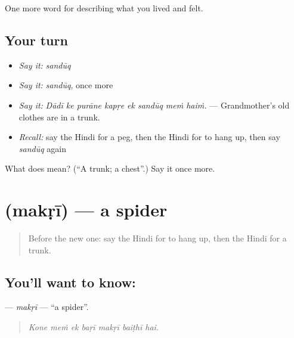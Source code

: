\begin{grammarlens}[title={What you've built}]
One more word for describing what you lived and felt.
\end{grammarlens}

\subsection*{Your turn}
\begin{itemize}
\raggedright
  \item \emph{Say it:} \emph{sandūq}
  \item \emph{Say it:} \emph{sandūq}, once more
  \item \emph{Say it:} \emph{Dādī ke purāne kapṛe ek sandūq meṁ haiṁ.} — Grandmother's old clothes are in a trunk.
  \item \emph{Recall:} say the Hindi for a peg, then the Hindi for to hang up, then say \emph{sandūq} again
\end{itemize}

\begin{tcolorbox}[breakable,colback=teal!4,colframe=teal!35!black,title={Before you move on}]
What does  mean? (\textquotedblleft{}A trunk; a chest\textquotedblright{}.) Say it once more.
\end{tcolorbox}
\section[\texorpdfstring{\hi{मकड़ी} (makṛī)}{मकड़ी (makṛī)}]{ (makṛī) — a spider}

\label{lesson:HI-C519-makri}



\begin{quote}
Before the new one: say the Hindi for to hang up, then the Hindi for a trunk.
\end{quote}

\subsection*{You'll want to know: }
\textbf{} — \emph{makṛī} — \textquotedblleft{}a spider\textquotedblright{}.

\begin{quote}
      
\end{quote}

\begin{quote}
\emph{Kone meṁ ek baṛī makṛī baiṭhī hai.}
\end{quote}

